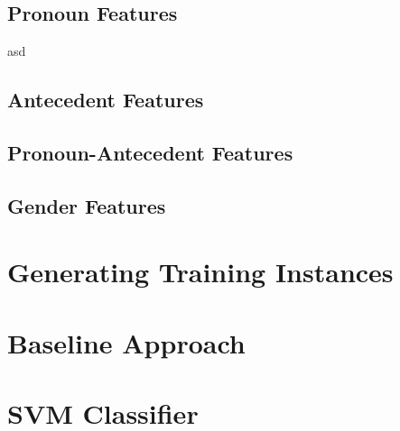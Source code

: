 \subsection{Pronoun Features}
asd
\subsection{Antecedent Features}

\subsection{Pronoun-Antecedent Features}

\subsection{Gender Features}

\section{Generating Training Instances}

\section{Baseline Approach}

\section{SVM Classifier}